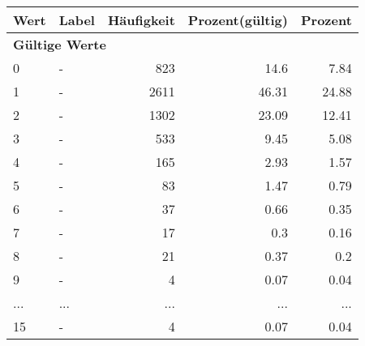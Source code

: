      \begin{longtable}{lXrrr}
     \toprule
     \textbf{Wert} & \textbf{Label} & \textbf{Häufigkeit} & \textbf{Prozent(gültig)} & \textbf{Prozent} \\
     \endhead
     \midrule
     \multicolumn{5}{l}{\textbf{Gültige Werte}}\\
        0 & \multicolumn{1}{X}{-} & %
          \num{823} &
          \num[round-mode=places,round-precision=2]{14.6} &
          \num[round-mode=places,round-precision=2]{7.84} \\
        1 & \multicolumn{1}{X}{-} & %
          \num{2611} &
          \num[round-mode=places,round-precision=2]{46.31} &
          \num[round-mode=places,round-precision=2]{24.88} \\
        2 & \multicolumn{1}{X}{-} & %
          \num{1302} &
          \num[round-mode=places,round-precision=2]{23.09} &
          \num[round-mode=places,round-precision=2]{12.41} \\
        3 & \multicolumn{1}{X}{-} & %
          \num{533} &
          \num[round-mode=places,round-precision=2]{9.45} &
          \num[round-mode=places,round-precision=2]{5.08} \\
        4 & \multicolumn{1}{X}{-} & %
          \num{165} &
          \num[round-mode=places,round-precision=2]{2.93} &
          \num[round-mode=places,round-precision=2]{1.57} \\
        5 & \multicolumn{1}{X}{-} & %
          \num{83} &
          \num[round-mode=places,round-precision=2]{1.47} &
          \num[round-mode=places,round-precision=2]{0.79} \\
        6 & \multicolumn{1}{X}{-} & %
          \num{37} &
          \num[round-mode=places,round-precision=2]{0.66} &
          \num[round-mode=places,round-precision=2]{0.35} \\
        7 & \multicolumn{1}{X}{-} & %
          \num{17} &
          \num[round-mode=places,round-precision=2]{0.3} &
          \num[round-mode=places,round-precision=2]{0.16} \\
        8 & \multicolumn{1}{X}{-} & %
          \num{21} &
          \num[round-mode=places,round-precision=2]{0.37} &
          \num[round-mode=places,round-precision=2]{0.2} \\
        9 & \multicolumn{1}{X}{-} & %
          \num{4} &
          \num[round-mode=places,round-precision=2]{0.07} &
          \num[round-mode=places,round-precision=2]{0.04} \\
       ... & ... & ... & ... & ... \\
        15 & \multicolumn{1}{X}{-} & %
          \num{4} &
          \num[round-mode=places,round-precision=2]{0.07} &
          \num[round-mode=places,round-precision=2]{0.04} \\


\end{longtable}

